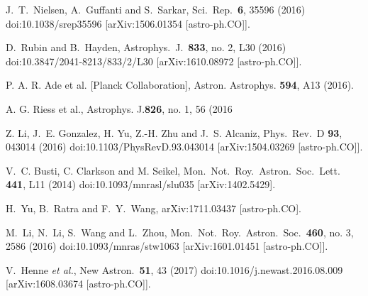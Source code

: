 \documentclass[nofootinbib,twocolumn]{revtex4}
\begin{document}
\begin{thebibliography}{99}
  J.~T.~Nielsen, A.~Guffanti and S.~Sarkar,
  Sci.\ Rep.\  {\bf 6}, 35596 (2016)
  doi:10.1038/srep35596
  [arXiv:1506.01354 [astro-ph.CO]].

  
  D.~Rubin and B.~Hayden,
  Astrophys.\ J.\  {\bf 833}, no. 2, L30 (2016)
  doi:10.3847/2041-8213/833/2/L30
  [arXiv:1610.08972 [astro-ph.CO]].
   
   
P. A. R. Ade et al. [Planck Collaboration], Astron. Astrophys. {\bf594}, A13 (2016).   


 A. G. Riess
et al., Astrophys. J.{\bf826}, no. 1, 56 (2016

    Z. Li, J.~E. Gonzalez, H. Yu, Z.-H. Zhu and J.~S. Alcaniz, 
    Phys.\ Rev.\ D {\bf 93}, 043014 (2016)
    doi:10.1103/PhysRevD.93.043014
    [arXiv:1504.03269 [astro-ph.CO]].

    V.~C. Busti, C. Clarkson and M. Seikel,
    Mon.\ Not.\ Roy.\ Astron.\ Soc.\ Lett. {\bf 441}, L11 (2014)
    doi:10.1093/mnrasl/slu035
    [arXiv:1402.5429].
    


  H.~Yu, B.~Ratra and F.~Y.~Wang,
  arXiv:1711.03437 [astro-ph.CO].


  M.~Li, N.~Li, S.~Wang and L.~Zhou,
  Mon.\ Not.\ Roy.\ Astron.\ Soc.\  {\bf 460}, no. 3, 2586 (2016)
  doi:10.1093/mnras/stw1063
  [arXiv:1601.01451 [astro-ph.CO]].
  
  
  V.~Henne {\it et al.},
  New Astron.\  {\bf 51}, 43 (2017)
  doi:10.1016/j.newast.2016.08.009
  [arXiv:1608.03674 [astro-ph.CO]].
 
  
\end{thebibliography}
\end{document}
